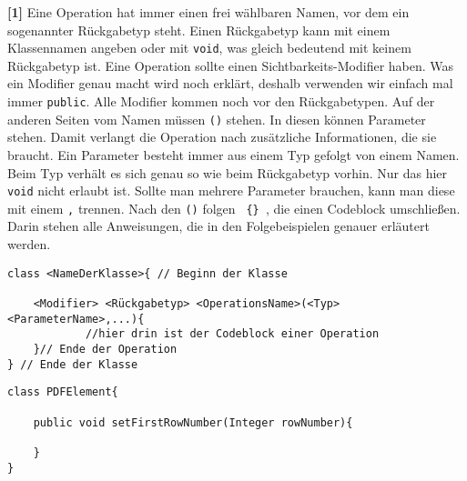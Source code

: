 \begin{enumerate}
          \textbf{[1]} Eine Operation hat immer einen frei wählbaren Namen, vor dem ein sogenannter Rückgabetyp steht.
          Einen Rückgabetyp kann mit einem Klassennamen angeben oder mit \lstinline{void}, was gleich bedeutend mit keinem      Rückgabetyp ist.
          Eine Operation sollte einen Sichtbarkeits-Modifier haben.
          Was ein Modifier genau macht wird noch erklärt, deshalb verwenden wir einfach mal immer \lstinline{public}.
          Alle Modifier kommen noch vor den Rückgabetypen.
          Auf der anderen Seiten vom Namen müssen \lstinline{()} stehen.
          In diesen können Parameter stehen. Damit verlangt die Operation nach zusätzliche Informationen, die sie braucht. Ein Parameter besteht immer aus einem Typ gefolgt von einem Namen.
          Beim Typ verhält es sich genau so wie beim Rückgabetyp vorhin. Nur das hier \lstinline{void} nicht erlaubt ist.
          Sollte man mehrere Parameter brauchen, kann man diese mit einem \lstinline{,} trennen.
          Nach den \lstinline{()} folgen \texttt{ \{\} }, die einen Codeblock umschließen. Darin stehen alle Anweisungen, die in den Folgebeispielen genauer erläutert werden.

          \begin{lstlisting}[title={\textbf{Klassen Syntax}}]
class <NameDerKlasse>{ // Beginn der Klasse

    <Modifier> <Rückgabetyp> <OperationsName>(<Typ> <ParameterName>,...){
            //hier drin ist der Codeblock einer Operation
    }// Ende der Operation
} // Ende der Klasse
                \end{lstlisting}
          \begin{lstlisting}[title={\textbf{Klassenbeispiel}}]
class PDFElement{
        
    public void setFirstRowNumber(Integer rowNumber){
                
    }                    
}
                                    \end{lstlisting}



\end{enumerate}
